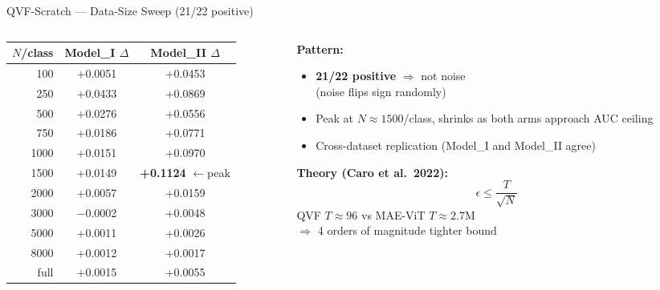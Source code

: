 \documentclass[aspectratio=169]{beamer}
\newcommand{\win}[1]{\textcolor{good}{\textbf{#1}}}
\begin{document}
\begin{frame}{QVF-Scratch — Data-Size Sweep (21/22 positive)}
\small
\begin{columns}
\begin{column}{0.52\textwidth}
\begin{tabular}{@{}rcc@{}}
\toprule
$N$/class & Model\_I $\Delta$ & Model\_II $\Delta$ \\
\midrule
100   & +0.0051 & +0.0453 \\
250   & +0.0433 & +0.0869 \\
500   & +0.0276 & +0.0556 \\
750   & +0.0186 & +0.0771 \\
1000  & +0.0151 & +0.0970 \\
\rowcolor{rowhi}
1500  & +0.0149 & \win{+0.1124} {\small$\leftarrow$peak} \\
2000  & +0.0057 & +0.0159 \\
3000  & $-$0.0002 & +0.0048 \\
5000  & +0.0011 & +0.0026 \\
8000  & +0.0012 & +0.0017 \\
full  & +0.0015 & +0.0055 \\
\bottomrule
\end{tabular}
\end{column}
\begin{column}{0.45\textwidth}
\textbf{Pattern:}
\begin{itemize}
  \item \win{21/22 positive} $\Rightarrow$ not noise\\
    (noise flips sign randomly)
  \item Peak at $N\approx1500$/class, shrinks as both arms approach AUC ceiling
  \item Cross-dataset replication (Model\_I and Model\_II agree)
\end{itemize}

\medskip
\textbf{Theory (Caro et al.\ 2022):}
\[\epsilon \leq \frac{T}{\sqrt{N}}\]
QVF $T\approx96$ vs MAE-ViT $T\approx2.7\text{M}$\\
$\Rightarrow$ 4 orders of magnitude tighter bound
\end{column}
\end{columns}
\end{frame}
\end{document}
